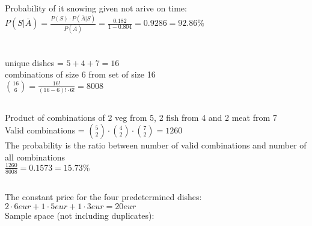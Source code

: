 \documentclass[a4paper,11pt]{article}
\begin{document}
\subsection{}

Probability of it snowing given not arive on time: \\

$P(S|\bar A) = \frac{P(S) \cdot P(\bar A|S)}{P(\bar A)} = \frac{0.182}{1-0.804} = 0.9286 = 92.86\%$

\section{}

\subsection{}

unique dishes = $5 + 4 + 7 = 16$ \\

combinations of size 6 from set of size 16 \\

$\binom{16}{6} = \frac{16!}{(16-6)! \cdot 6!} = 8008$

\subsection{}

Product of combinations of 2 veg from 5, 2 fish from 4 and 2 meat from 7 \\

Valid combinations = $\binom{5}{2} \cdot \binom{4}{2} \cdot \binom{7}{2} = 1260$\\

\noindent The probability is the ratio between number of valid combinations and number of all combinations \\

$\frac{1260}{8008} = 0.1573 = 15.73\%$

\subsection{}

The constant price for the four predetermined dishes:\\

$2 \cdot 6eur + 1 \cdot 5eur + 1 \cdot 3eur = 20eur$\\

\noindent Sample space (not including duplicates): \\
\end{document}
